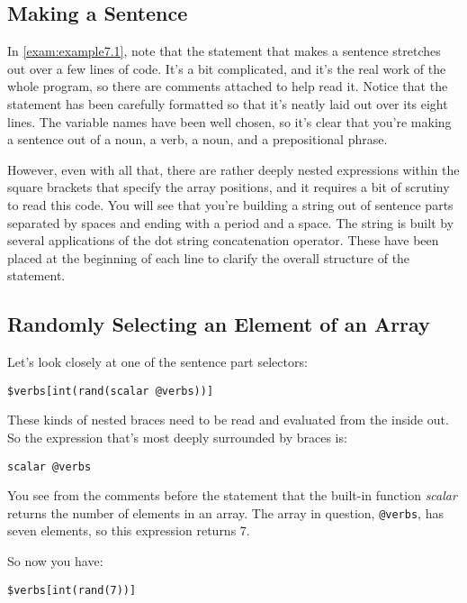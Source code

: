 \subsection{Making a Sentence}
In \autoref{exam:example7.1}, note that the statement that makes a sentence stretches out over a few lines of code. It's a bit complicated, and it's the real work of the whole program, so there are comments attached to help read it. Notice that the statement has been carefully formatted so that it's neatly laid out over its eight lines. The variable names have been well chosen, so it's clear that you're making a sentence out of a noun, a verb, a noun, and a prepositional phrase.

However, even with all that, there are rather deeply nested expressions within the square brackets that specify the array positions, and it requires a bit of scrutiny to read this code. You will see that you're building a string out of sentence parts separated by spaces and ending with a period and a space. The string is built by several applications of the dot string concatenation operator. These have been placed at the beginning of each line to clarify the overall structure of the statement. 

\subsection{Randomly Selecting an Element of an Array}
Let's look closely at one of the sentence part selectors:

\begin{lstlisting}
$verbs[int(rand(scalar @verbs))] 
\end{lstlisting}

These kinds of nested braces need to be read and evaluated from the inside out. So the expression that's most deeply surrounded by braces is:

\begin{lstlisting}
scalar @verbs
\end{lstlisting}

You see from the comments before the statement that the built-in function \textit{scalar} returns the number of elements in an array. The array in question, \verb|@verbs|, has seven elements, so this expression returns 7.

So now you have:

\begin{lstlisting}
$verbs[int(rand(7))]
\end{lstlisting}

